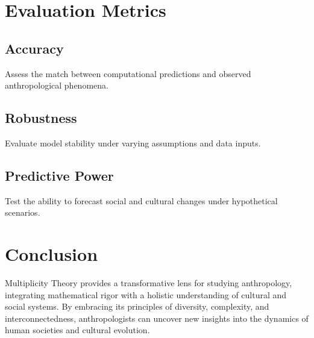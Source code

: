 \documentclass{article}
\theoremstyle{plain}
\begin{document}
\section{Evaluation Metrics}

\subsection{Accuracy}
Assess the match between computational predictions and observed anthropological phenomena.

\subsection{Robustness}
Evaluate model stability under varying assumptions and data inputs.

\subsection{Predictive Power}
Test the ability to forecast social and cultural changes under hypothetical scenarios.

\section{Conclusion}
Multiplicity Theory provides a transformative lens for studying anthropology, integrating mathematical rigor with a holistic understanding of cultural and social systems. By embracing its principles of diversity, complexity, and interconnectedness, anthropologists can uncover new insights into the dynamics of human societies and cultural evolution.



\nocite{*}


\end{document}
